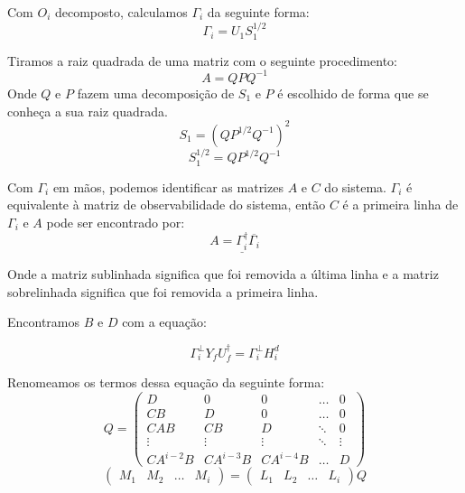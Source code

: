 Com $O_i$ decomposto, calculamos $\Gamma_i$ da seguinte forma:
\begin{equation}\label{eq:gammai}
\Gamma_i=U_1 S_1^{1/2}
\end{equation}

Tiramos a raiz quadrada de uma matriz com o seguinte procedimento:
\begin{equation}
A=QPQ^{-1}
\end{equation}
Onde $Q$ e $P$ fazem uma decomposição de $S_1$ e $P$ é escolhido de forma que se conheça a sua raiz quadrada.
\begin{equation}
S_1=(QP^{1/2}Q^{-1})^2
\end{equation}
\begin{equation} \label{eq:raizs1}
S_1^{1/2}=QP^{1/2}Q^{-1}
\end{equation}

Com $\Gamma_i$ em mãos, podemos identificar as matrizes $A$ e $C$ do sistema. $\Gamma_i$ é equivalente à matriz de observabilidade do sistema, então $C$ é a primeira linha de $\Gamma_i$ e $A$ pode ser encontrado por:
\begin{equation}\label{eq:matriza}
A=\underline{\Gamma_i^\dagger}\overline{\Gamma_i}
\end{equation}

Onde a matriz sublinhada significa que foi removida a última linha e a matriz sobrelinhada significa que foi removida a primeira linha.


Encontramos $B$ e $D$ com a equação:

\begin{equation}
\Gamma_i ^\perp Y_f U_f ^\dagger=\Gamma_i ^\perp H^d_i
\end{equation}

Renomeamos os termos dessa equação da seguinte forma:
\begin{equation}
Q=\begin{pmatrix}
D& 0 & 0 & \dots & 0\\
CB & D & 0 & \dots & 0\\
CAB & CB & D & \ddots & 0\\
\vdots & \vdots & \vdots & \ddots & \vdots\\
CA^{i-2}B & CA^{i-3}B & CA^{i-4}B& \dots & D
\end{pmatrix}
\end{equation}
\begin{equation}
\begin{pmatrix}
M_1 & M_2 & \dots & M_i
\end{pmatrix}
=
\begin{pmatrix}
L_1 & L_2 & \dots & L_i
\end{pmatrix}Q
\end{equation}

